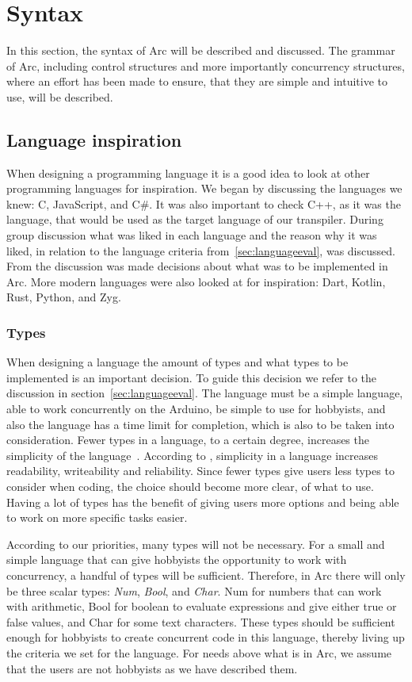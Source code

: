 \section{Syntax}\label{sec:syntax}
In this section, the syntax of Arc will be described and discussed. The grammar of Arc, including control structures and more importantly concurrency structures, where an effort has been made to ensure, that they are simple and intuitive to use, will be described.

\subsection{Language inspiration}\label{sec:inspiration}
When designing a programming language it is a good idea to look at other programming languages for inspiration. We began by discussing the languages we knew: C, JavaScript, and C\#. It was also important to check C++, as it was the language, that would be used as the target language of our transpiler. During group discussion what was liked in each language and the reason why it was liked, in relation to the language criteria from~\ref{sec:languageeval}, was discussed. From the discussion was made decisions about what was to be implemented in Arc. More modern languages were also looked at for inspiration: Dart, Kotlin, Rust, Python, and Zyg.

\subsubsection{Types}

When designing a language the amount of types and what types to be implemented is an important decision. To guide this decision we refer to the discussion in section~\ref{sec:languageeval}. The language must be a simple language, able to work concurrently on the Arduino, be simple to use for hobbyists, and also the language has a time limit for completion, which is also to be taken into consideration. Fewer types in a language, to a certain degree, increases the simplicity of the language~\cite{Sebesta2016}. According to , simplicity in a language increases readability, writeability and reliability. Since fewer types give users less types to consider when coding, the choice should become more clear, of what to use. Having a lot of types has the benefit of giving users more options and being able to work on more specific tasks easier.

According to our priorities, many types will not be necessary. For a small and simple language that can give hobbyists the opportunity to work with concurrency, a handful of types will be sufficient. Therefore, in Arc there will only be three scalar types: \textit{Num}, \textit{Bool}, and \textit{Char}. Num for numbers that can work with arithmetic, Bool for boolean to evaluate expressions and give either true or false values, and Char for some text characters. These types should be sufficient enough for hobbyists to create concurrent code in this language, thereby living up the criteria we set for the language. For needs above what is in Arc, we assume that the users are not hobbyists as we have described them.


